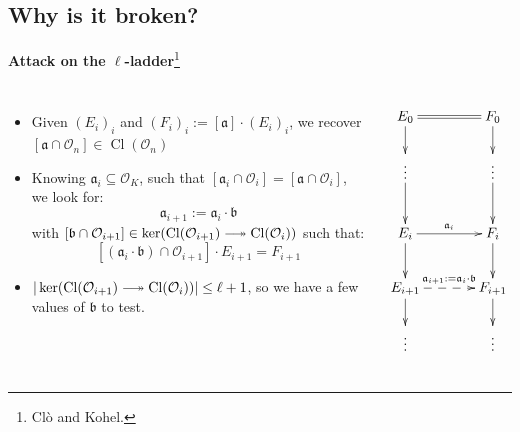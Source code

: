 \documentclass[10pt]{beamer}
\theoremstyle{plain}
\theoremstyle{definition}
\newcommand{\mO}{\mathcal{O}}
\renewcommand{\(}{\left(}
\renewcommand{\)}{\right)}
\newcommand{\mf}[1]{\mathfrak{#1}}
\DeclareMathOperator{\Cl}{Cl}
\begin{document}
\subsection{Why is it broken?}

\begin{frame}
\textbf{Attack on the $\ell$-ladder}\footnote[frame]{Cl\`{o} and Kohel.}

\begin{columns}[t]

\begin{itemize}
\item Given $(E_i)_{i}$ and $(F_i)_i:=[\mf{a}]\cdot (E_i)_i$, we recover $[\mf{a}\cap\mO_n]\in\Cl(\mO_n)$

\item Knowing $\mf{a}_i\subseteq \mO_K$, such that $[\mf{a}_i\cap\mO_i]=[\mf{a}\cap \mO_i]$, we look for:
\[\mf{a}_{i+1}:=\mf{a}_i\cdot \mf{b}\]
with $[\mf{b}\cap\mO_{i+1}]\in\ker(\Cl(\mO_{i+1})\relbar\joinrel\twoheadrightarrow\Cl(\mO_{i}))$ such that:
\[[(\mf{a}_i\cdot \mf{b})\cap\mO_{i+1}]\cdot E_{i+1}=F_{i+1}\]

\item $|\ker(\Cl(\mO_{i+1})\relbar\joinrel\twoheadrightarrow\Cl(\mO_{i}))|\leq\ell+1$, so we have a few values of $\mf{b}$ to test.
\end{itemize}

\[\xymatrix@C+1pc{
E_0 \ar[d] \ar@2{-}[r]& F_0\ar[d]\\
\vdots \ar[d] & \vdots \ar[d]\\
E_i \ar[d] \ar[r]^{\mf{a}_i} & F_i\ar[d]\\
E_{i+1} \ar[d] \ar@{-->}[r]^{\mf{a}_{i+1}:=\mf{a}_i\cdot\mf{b}} & F_{i+1}\ar[d]\\
\vdots & \vdots\\
}\]
\end{columns}

\end{frame}





\end{document}
